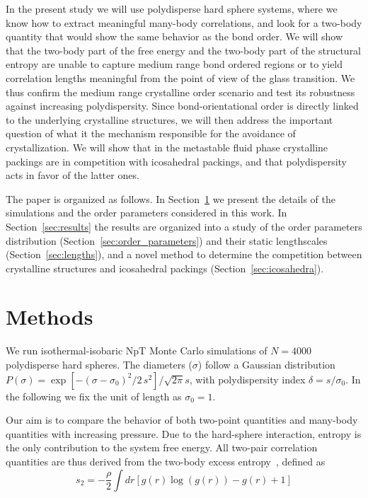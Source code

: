 \documentclass[twocolumn,superscriptaddress]{revtex4-1}
\begin{document}
In the present study we will use polydisperse hard sphere systems, where we know how to extract meaningful many-body correlations, and look for a two-body quantity that would show the same behavior as the bond order. We will show that the two-body part of the free energy and the two-body part of the structural entropy are unable to capture medium range bond ordered regions or to yield correlation lengths meaningful from the point of view of the glass transition. We thus confirm the medium range crystalline order scenario and test its robustness against increasing polydispersity.
Since bond-orientational order is directly linked to the underlying crystalline structures, we will then address the important question
of what it the mechanism responsible for the avoidance of crystallization. We will show that in the metastable fluid phase crystalline packings
are in competition with icosahedral packings, and that polydispersity acts in favor of the latter ones.

The paper is organized as follows. In Section~\ref{sec:methods} we present the details of the simulations and the order parameters considered in this work. In Section~\ref{sec:results} the results are organized into
a study of the order parameters distribution (Section~\ref{sec:order_parameters}) and their static lengthscales (Section~\ref{sec:lengths}), and a novel method to determine the competition between crystalline structures
and icosahedral packings (Section~\ref{sec:icosahedra}).

\section{Methods}\label{sec:methods}
We run isothermal-isobaric NpT Monte Carlo simulations of $N=4000$ polydisperse hard spheres.
The diameters ($\sigma$) follow a Gaussian distribution $P(\sigma)=\exp{\left[-(\sigma-\sigma_0)^2/2\,s^2\right]}/\sqrt{2\pi} s$,
with polydispersity index $\delta=s/\sigma_0$. In the following we fix the unit of length as $\sigma_0=1$.

Our aim is to compare the behavior of both two-point quantities and many-body quantities with increasing pressure.
Due to the hard-sphere interaction, entropy is the only contribution to the system free energy.
All two-pair correlation quantities are thus derived from the two-body excess entropy~\cite{Nettleton1958,Mountain1971},
defined as
\begin{equation}
s_2=-\frac{\rho}{2}\int dr\left[g(r)\log(g(r))-g(r)+1\right]
\end{equation}
\end{document}
